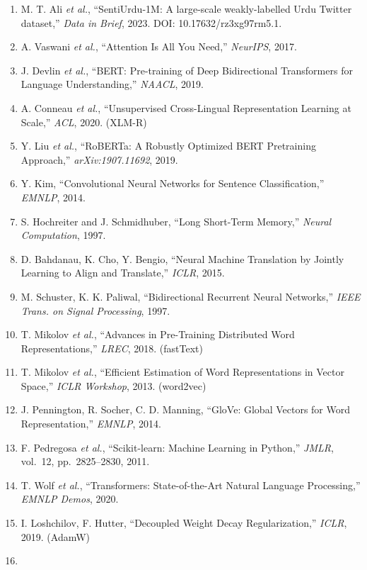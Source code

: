 \documentclass[
  english,
  11pt,
]{article}
\providecommand{\tightlist}{%
  \setlength{\itemsep}{0pt}\setlength{\parskip}{0pt}}
\begin{document}
\begin{enumerate}
\def\labelenumi{\arabic{enumi}.}
\tightlist
\item
  M. T. Ali \emph{et al.}, ``SentiUrdu-1M: A large-scale weakly-labelled
  Urdu Twitter dataset,'' \emph{Data in Brief}, 2023. DOI:
  10.17632/rz3xg97rm5.1.
\item
  A. Vaswani \emph{et al.}, ``Attention Is All You Need,''
  \emph{NeurIPS}, 2017.
\item
  J. Devlin \emph{et al.}, ``BERT: Pre-training of Deep Bidirectional
  Transformers for Language Understanding,'' \emph{NAACL}, 2019.
\item
  A. Conneau \emph{et al.}, ``Unsupervised Cross-Lingual Representation
  Learning at Scale,'' \emph{ACL}, 2020. (XLM-R)
\item
  Y. Liu \emph{et al.}, ``RoBERTa: A Robustly Optimized BERT Pretraining
  Approach,'' \emph{arXiv:1907.11692}, 2019.
\item
  Y. Kim, ``Convolutional Neural Networks for Sentence Classification,''
  \emph{EMNLP}, 2014.
\item
  S. Hochreiter and J. Schmidhuber, ``Long Short-Term Memory,''
  \emph{Neural Computation}, 1997.
\item
  D. Bahdanau, K. Cho, Y. Bengio, ``Neural Machine Translation by
  Jointly Learning to Align and Translate,'' \emph{ICLR}, 2015.
\item
  M. Schuster, K. K. Paliwal, ``Bidirectional Recurrent Neural
  Networks,'' \emph{IEEE Trans. on Signal Processing}, 1997.
\item
  T. Mikolov \emph{et al.}, ``Advances in Pre-Training Distributed Word
  Representations,'' \emph{LREC}, 2018. (fastText)
\item
  T. Mikolov \emph{et al.}, ``Efficient Estimation of Word
  Representations in Vector Space,'' \emph{ICLR Workshop}, 2013.
  (word2vec)
\item
  J. Pennington, R. Socher, C. D. Manning, ``GloVe: Global Vectors for
  Word Representation,'' \emph{EMNLP}, 2014.
\item
  F. Pedregosa \emph{et al.}, ``Scikit-learn: Machine Learning in
  Python,'' \emph{JMLR}, vol.~12, pp.~2825--2830, 2011.
\item
  T. Wolf \emph{et al.}, ``Transformers: State-of-the-Art Natural
  Language Processing,'' \emph{EMNLP Demos}, 2020.
\item
  I. Loshchilov, F. Hutter, ``Decoupled Weight Decay Regularization,''
  \emph{ICLR}, 2019. (AdamW)
\item

\end{enumerate}
\end{document}
